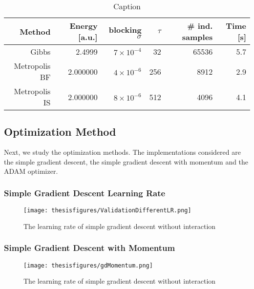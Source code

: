 \documentclass[twoside,english]{uiofysmaster}
\newcommand{\ra}[1]{\renewcommand{\arraystretch}{#1}}
\begin{document}
\begin{table*}\centering
\ra{1.3}
\caption{Caption}
\label{tab:SamplingCompare}
\begin{tabular}{rrrrrr}
\toprule
\toprule
Method & Energy [a.u.]  & blocking $\sigma$  & $\tau$ &  \# ind. samples & Time [s] \\ 
\midrule 
Gibbs         & 2.4999  & $7\times10^{-4}$ &  32 & 65536 & 5.7 \\
Metropolis BF & 2.000000 & $4\times10^{-6}$ & 256 & 8912 & 2.9 \\
Metropolis IS & 2.000000 & $8\times10^{-6}$ & 512 & 4096 & 4.1 \\
\bottomrule
\bottomrule
\end{tabular}
\end{table*}





\subsection{Optimization Method}
Next, we study the optimization methods. The implementations considered are the simple gradient descent, the simple gradient descent with momentum and the ADAM optimizer. 



\subsubsection{Simple Gradient Descent Learning Rate}



\begin{figure}
\centering
 \texttt{[image: thesisfigures/ValidationDifferentLR.png]}
 \caption{The learning rate of simple gradient descent without interaction}
 \label{fig:ValidationDifferentLR}
\end{figure}

\subsubsection{Simple Gradient Descent with Momentum}



\begin{figure}
\centering
 \texttt{[image: thesisfigures/gdMomentum.png]}
 \caption{The learning rate of simple gradient descent without interaction}
 \label{fig:gdMomentum}
\end{figure}
\end{document}
